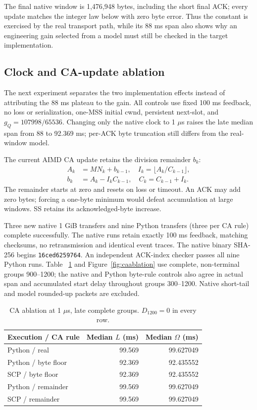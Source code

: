 \documentclass[sigconf,nonacm]{acmart}
\begin{document}
The final native window is 1,476,948 bytes, including the short final ACK;
every update matches the integer law below with zero byte error. Thus
the constant is exercised by the real transport path, while its 88 ms
span also shows why an engineering gain selected from a model must still
be checked in the target implementation.

\subsection{Clock and CA-update ablation}
The next experiment separates the two implementation effects instead of
attributing the 88 ms plateau to the gain. All controls use fixed 100 ms
feedback, no loss or serialization, one-MSS initial cwnd, persistent
next-slot, and $g_Q=107998/65536$. Changing only the native clock to
1 $\mu$s raises the late median span from 88 to 92.369 ms; per-ACK byte
truncation still differs from the real-window model.

The current AIMD CA update retains the division remainder $b_k$:
\begin{equation}
\begin{aligned}
 A_k&=M N_k+b_{k-1},\quad I_k=\lfloor A_k/C_{k-1}\rfloor,\\
 b_k&=A_k-I_k C_{k-1},\quad C_k=C_{k-1}+I_k.
\end{aligned}\label{eq:cacarry}
\end{equation}
The remainder starts at zero and resets on loss or timeout. An ACK may
add zero bytes; forcing a one-byte minimum would defeat accumulation at
large windows. SS retains its acknowledged-byte increase.

Three new native 1 GiB transfers and nine Python transfers (three per
CA rule) complete successfully. The native runs retain exactly 100 ms
feedback, matching checksums, no retransmission and identical event
traces. The native binary SHA-256 begins \texttt{16ced6259764}.
An independent ACK-index checker passes all nine Python runs. Table~
\ref{tab:caablation} and Figure~\ref{fig:caablation} use complete,
non-terminal groups 900--1200; the native and Python byte-rule controls
also agree in actual span and accumulated start delay throughout groups
300--1200. Native short-tail and model rounded-up packets are excluded.

\begin{table}[t]\small\centering
\caption{CA ablation at 1 $\mu$s, late complete groups. $D_{1200}=0$ in every row.}\label{tab:caablation}
\begin{tabular}{@{}lrr@{}}\toprule
Execution / CA rule & Median $L$ (ms) & Median $\Omega$ (ms) \\\midrule
Python / real & 99.569 & 99.627049 \\
Python / byte floor & 92.369 & 92.435552 \\
SCP / byte floor & 92.369 & 92.435552 \\
Python / remainder & 99.569 & 99.627049 \\
SCP / remainder & 99.569 & 99.627049 \\\bottomrule
\end{tabular}\end{table}
\end{document}

